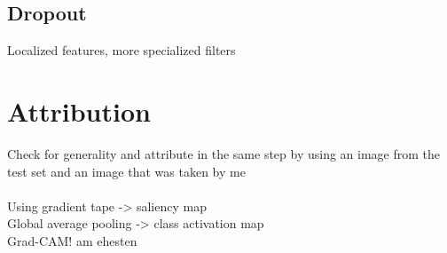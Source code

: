 \documentclass{article}
\begin{document}
\begin{multicols}{2}
\subsection{Dropout}
Localized features, more specialized filters


\section{Attribution}

Check for generality and attribute in the same step by using an image from the test set and an image that was taken by me\\
\\
Using gradient tape -> saliency map\\
Global average pooling -> class activation map\\
Grad-CAM! am ehesten

\end{multicols}
\end{document}
